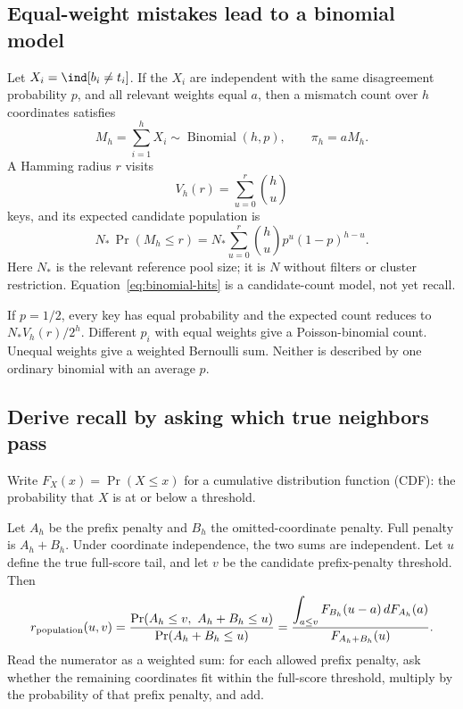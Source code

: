 \subsection{Equal-weight mistakes lead to a binomial model}
Let $X_i=\ind[b_i\ne t_i]$. If the $X_i$ are independent with the same disagreement probability
$p$, and all relevant weights equal $a$, then a mismatch count over $h$ coordinates satisfies
\begin{equation}
M_h=\sum_{i=1}^{h}X_i\sim\operatorname{Binomial}(h,p),\qquad
\pi_h=aM_h.
\label{eq:binomial}
\end{equation}
A Hamming radius $r$ visits
\begin{equation}
V_h(r)=\sum_{u=0}^{r}\binom{h}{u}
\label{eq:hamming-volume}
\end{equation}
keys, and its expected candidate population is
\begin{equation}
N_*\,\Pr(M_h\leq r)
=N_*\sum_{u=0}^{r}\binom{h}{u}p^u(1-p)^{h-u}.
\label{eq:binomial-hits}
\end{equation}
Here $N_*$ is the relevant reference pool size; it is $N$ without filters or cluster restriction.
Equation~\eqref{eq:binomial-hits} is a candidate-count model, not yet recall.

If $p=1/2$, every key has equal probability and the expected count reduces to $N_*V_h(r)/2^h$.
Different $p_i$ with equal weights give a Poisson-binomial count. Unequal weights give a
weighted Bernoulli sum. Neither is described by one ordinary binomial with an average $p$.

\subsection{Derive recall by asking which true neighbors pass}
Write $F_X(x)=\Pr(X\leq x)$ for a cumulative distribution function (CDF): the probability that $X$ is at or below a threshold.

Let $A_h$ be the prefix penalty and $B_h$ the omitted-coordinate penalty. Full penalty is
$A_h+B_h$. Under coordinate independence, the two sums are independent. Let $u$ define the
true full-score tail, and let $v$ be the candidate prefix-penalty threshold. Then
\begin{equation}
r_{\rm population}(u,v)=
\frac{\Pr(A_h\leq v,\ A_h+B_h\leq u)}{\Pr(A_h+B_h\leq u)}
=\frac{\displaystyle\int_{a\leq v}F_{B_h}(u-a)\,dF_{A_h}(a)}
 {F_{A_h+B_h}(u)}.
\label{eq:population-recall}
\end{equation}
Read the numerator as a weighted sum: for each allowed prefix penalty, ask whether the remaining coordinates fit within the full-score threshold, multiply by the probability of that prefix penalty, and add.

